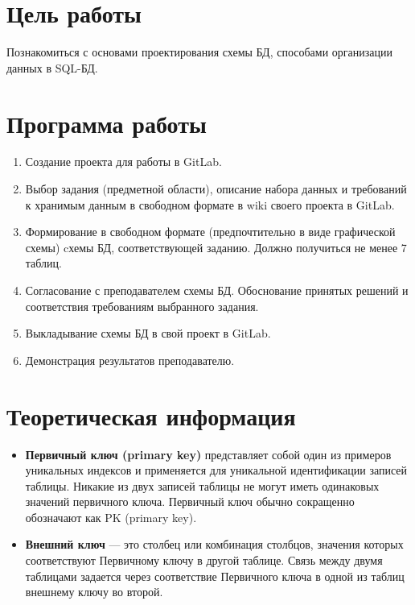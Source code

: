 
\usepackage{minted}




\newpage
\setcounter{page}{2}


\section{Цель работы}
Познакомиться с основами проектирования схемы БД, способами организации данных в SQL-БД.

\section{Программа работы}
	\begin {enumerate}
	\item Создание проекта для работы в GitLab.
	\item Выбор задания (предметной области), описание набора данных и требований к хранимым данным в свободном формате в wiki своего проекта в GitLab.
	\item Формирование в свободном формате (предпочтительно в виде графической схемы) cхемы БД, соответствующей заданию. Должно получиться не менее 7 таблиц.
	\item Согласование с преподавателем схемы БД. Обоснование принятых решений и соответствия требованиям выбранного задания. 
	\item Выкладывание схемы БД в свой проект в GitLab.
	\item Демонстрация результатов преподавателю.
	\end {enumerate}

\section{Теоретическая информация}

\begin {itemize}
\item \textbf{Первичный ключ (primary key)} представляет собой один из примеров уникальных индексов и применяется для уникальной идентификации записей таблицы. Никакие из двух записей таблицы не могут иметь одинаковых значений первичного ключа. Первичный ключ обычно сокращенно обозначают как PK (primary key).

\item \textbf{Внешний ключ} — это столбец или комбинация столбцов, значения которых соответствуют Первичному ключу в другой таблице. Связь между двумя таблицами задается через соответствие Первичного ключа в одной из таблиц внешнему ключу во второй.
\end {itemize}

